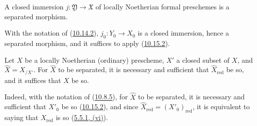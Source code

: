 \begin{proposition}[10.15.6]
\label{I.10.15.6}
A closed immersion $j:\mathfrak{Y}\to\mathfrak{X}$ of locally Noetherian
formal preschemes is a separated morphism.
\end{proposition}

With the notation of (\hyperref[I.10.14.2]{10.14.2}),
$j_0:Y_0\to X_0$ is a closed immersion, hence a separated morphism, and it
suffices to apply (\hyperref[I.10.15.2]{10.15.2}).

\begin{proposition}[10.15.7]
\label{I.10.15.7}
Let $X$ be a locally Noetherian (ordinary) prescheme, $X'$ a closed
subset of $X$, and $\widehat{X}=X_{/X'}$. For $\widehat{X}$ to be separated,
it is necessary and sufficient that $\widehat{X}_{\mathrm{red}}$ be so, and
it suffices that $X$ be so.
\end{proposition}

Indeed, with the notation of (\hyperref[I.10.8.5]{10.8.5}), for
$\widehat{X}$ to be separated, it is necessary and sufficient that $X'_0$ be
so (\hyperref[I.10.15.2]{10.15.2}), and since
$\widehat{X}_{\mathrm{red}}=(X'_0)_{\mathrm{red}}$, it is equivalent to
saying that $\widehat{X}_{\mathrm{red}}$ is so
(\hyperref[I.5.5.1]{5.5.1, (vi)}).
